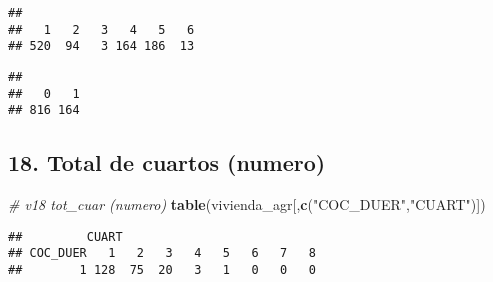 \documentclass[11pt,]{article}
\newenvironment{Shaded}{\begin{snugshade}}{\end{snugshade}}
\newcommand{\KeywordTok}[1]{\textcolor[rgb]{0.13,0.29,0.53}{\textbf{#1}}}
\newcommand{\StringTok}[1]{\textcolor[rgb]{0.31,0.60,0.02}{#1}}
\newcommand{\CommentTok}[1]{\textcolor[rgb]{0.56,0.35,0.01}{\textit{#1}}}
\newcommand{\OperatorTok}[1]{\textcolor[rgb]{0.81,0.36,0.00}{\textbf{#1}}}
\newcommand{\NormalTok}[1]{#1}
\begin{document}
\begin{verbatim}
## 
##   1   2   3   4   5   6 
## 520  94   3 164 186  13
\end{verbatim}

\begin{Shaded}
\end{Shaded}

\begin{verbatim}
## 
##   0   1 
## 816 164
\end{verbatim}

\subsection{18. Total de cuartos
(numero)}\label{total-de-cuartos-numero}

\begin{Shaded}
\begin{Highlighting}[]
\CommentTok{# v18 tot_cuar (numero)}
\KeywordTok{table}\NormalTok{(vivienda_agr[,}\KeywordTok{c}\NormalTok{(}\StringTok{"COC_DUER"}\NormalTok{,}\StringTok{"CUART"}\NormalTok{)])}
\end{Highlighting}
\end{Shaded}

\begin{verbatim}
##         CUART
## COC_DUER   1   2   3   4   5   6   7   8
##        1 128  75  20   3   1   0   0   0
\end{verbatim}
\end{document}
